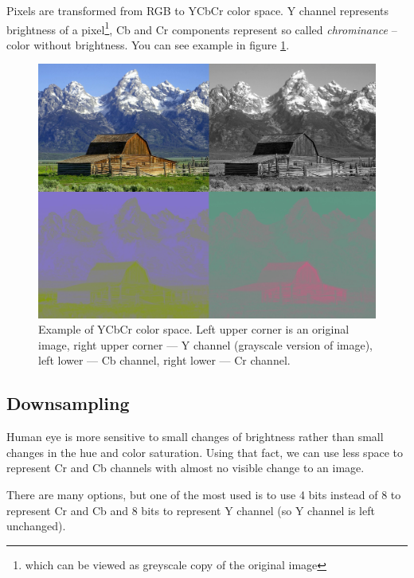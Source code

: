Pixels are transformed from RGB to YCbCr color space. Y channel represents
brightness of a pixel\footnote{which can be viewed as greyscale copy of the original image},
Cb and Cr components represent so called \textit{chrominance} -- color without brightness. 
You can see example in figure \ref{img:YCbCr}.


\begin{figure}
\centerline{\includegraphics[height=0.4\textheight]{images/Barns_grand_tetons_YCbCr_separation_quad.jpg}}
\caption[Example of YCbCr color space (Public domain)]{Example of YCbCr color space. 
Left upper corner is an original image,
right upper corner --- Y channel (grayscale version of image),
left lower --- Cb channel,
right lower --- Cr channel.}
\label{img:YCbCr}
\end{figure}

\subsection{Downsampling}

Human eye is more sensitive to small changes of brightness rather 
than small changes in the hue and color saturation. Using that fact, 
we can use less space to represent Cr and Cb channels with almost no visible change
to an image. 

There are many options, but one of the most used is to use 4 bits instead of 8
to represent Cr and Cb and 8 bits to represent Y channel (so Y channel is left unchanged).

